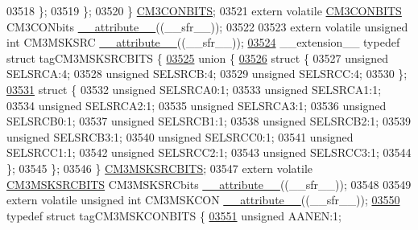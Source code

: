 \begin{DoxyCode}
03518     \};
03519   \};
03520 \} \hyperlink{a00015_de/dc8/a00325}{CM3CONBITS};
03521 \textcolor{keyword}{extern} \textcolor{keyword}{volatile} \hyperlink{a00015_de/dc8/a00325}{CM3CONBITS} CM3CONbits \hyperlink{a00015_a493c46f03454991ccc5aa7a6e1dfb2a7}{\_\_attribute\_\_}((\_\_sfr\_\_));
03522 
03523 \textcolor{keyword}{extern} \textcolor{keyword}{volatile} \textcolor{keywordtype}{unsigned} \textcolor{keywordtype}{int}  CM3MSKSRC \hyperlink{a00015_a493c46f03454991ccc5aa7a6e1dfb2a7}{\_\_attribute\_\_}((\_\_sfr\_\_));
\hypertarget{a00015_source_l03524}{}\hyperlink{a00015}{03524} \_\_extension\_\_ \textcolor{keyword}{typedef} \textcolor{keyword}{struct }tagCM3MSKSRCBITS \{
\hypertarget{a00015_source_l03525}{}\hyperlink{a00015}{03525}   \textcolor{keyword}{union }\{
\hypertarget{a00015_source_l03526}{}\hyperlink{a00015}{03526}     \textcolor{keyword}{struct }\{
03527       \textcolor{keywordtype}{unsigned} SELSRCA:4;
03528       \textcolor{keywordtype}{unsigned} SELSRCB:4;
03529       \textcolor{keywordtype}{unsigned} SELSRCC:4;
03530     \};
\hypertarget{a00015_source_l03531}{}\hyperlink{a00015}{03531}     \textcolor{keyword}{struct }\{
03532       \textcolor{keywordtype}{unsigned} SELSRCA0:1;
03533       \textcolor{keywordtype}{unsigned} SELSRCA1:1;
03534       \textcolor{keywordtype}{unsigned} SELSRCA2:1;
03535       \textcolor{keywordtype}{unsigned} SELSRCA3:1;
03536       \textcolor{keywordtype}{unsigned} SELSRCB0:1;
03537       \textcolor{keywordtype}{unsigned} SELSRCB1:1;
03538       \textcolor{keywordtype}{unsigned} SELSRCB2:1;
03539       \textcolor{keywordtype}{unsigned} SELSRCB3:1;
03540       \textcolor{keywordtype}{unsigned} SELSRCC0:1;
03541       \textcolor{keywordtype}{unsigned} SELSRCC1:1;
03542       \textcolor{keywordtype}{unsigned} SELSRCC2:1;
03543       \textcolor{keywordtype}{unsigned} SELSRCC3:1;
03544     \};
03545   \};
03546 \} \hyperlink{a00015_dc/d50/a00332}{CM3MSKSRCBITS};
03547 \textcolor{keyword}{extern} \textcolor{keyword}{volatile} \hyperlink{a00015_dc/d50/a00332}{CM3MSKSRCBITS} CM3MSKSRCbits \hyperlink{a00015_a493c46f03454991ccc5aa7a6e1dfb2a7}{\_\_attribute\_\_}((\_\_sfr\_\_));
03548 
03549 \textcolor{keyword}{extern} \textcolor{keyword}{volatile} \textcolor{keywordtype}{unsigned} \textcolor{keywordtype}{int}  CM3MSKCON \hyperlink{a00015_a493c46f03454991ccc5aa7a6e1dfb2a7}{\_\_attribute\_\_}((\_\_sfr\_\_));
\hypertarget{a00015_source_l03550}{}\hyperlink{a00015}{03550} \textcolor{keyword}{typedef} \textcolor{keyword}{struct }tagCM3MSKCONBITS \{
\hypertarget{a00015_source_l03551}{}\hyperlink{a00015_a6ea89b9cbdf0bbde3ec8147513e70fa0}{03551}   \textcolor{keywordtype}{unsigned} AANEN:1;

\end{DoxyCode}
